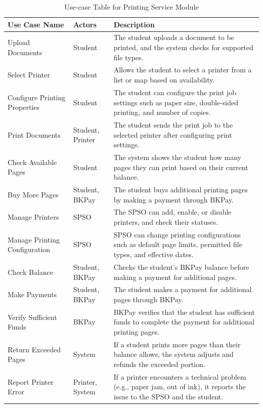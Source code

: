 \clearpage
\begin{table}[h!]
\centering
\renewcommand{\arraystretch}{1.8}
\begin{tabular}{|>{\raggedright\arraybackslash}p{3cm}|>{\centering\arraybackslash}p{3cm}|p{7cm}|}
\hline
\textbf{Use Case Name} & \textbf{Actors} & \textbf{Description} \\ \hline
Upload Documents & Student & The student uploads a document to be printed, and the system checks for supported file types. \\ \hline
Select Printer & Student & Allows the student to select a printer from a list or map based on availability. \\ \hline
Configure Printing Properties & Student & The student can configure the print job settings such as paper size, double-sided printing, and number of copies. \\ \hline
Print Documents & Student, Printer & The student sends the print job to the selected printer after configuring print settings. \\ \hline
Check Available Pages & Student & The system shows the student how many pages they can print based on their current balance. \\ \hline
Buy More Pages & Student, BKPay & The student buys additional printing pages by making a payment through BKPay. \\ \hline
Manage Printers & SPSO & The SPSO can add, enable, or disable printers, and check their statuses. \\ \hline
Manage Printing Configuration & SPSO & SPSO can change printing configurations such as default page limits, permitted file types, and effective dates. \\ \hline
Check Balance & Student, BKPay & Checks the student’s BKPay balance before making a payment for additional pages. \\ \hline
Make Payments & Student, BKPay & The student makes a payment for additional pages through BKPay. \\ \hline
Verify Sufficient Funds & BKPay & BKPay verifies that the student has sufficient funds to complete the payment for additional printing pages. \\ \hline
Return Exceeded Pages & System & If a student prints more pages than their balance allows, the system adjusts and refunds the exceeded portion. \\ \hline
Report Printer Error & Printer, System & If a printer encounters a technical problem (e.g., paper jam, out of ink), it reports the issue to the SPSO and the student. \\ [1ex] \hline
\end{tabular}
\caption{Use-case Table for Printing Service Module}
\label{tab:printing_service_use_case}
\end{table}

